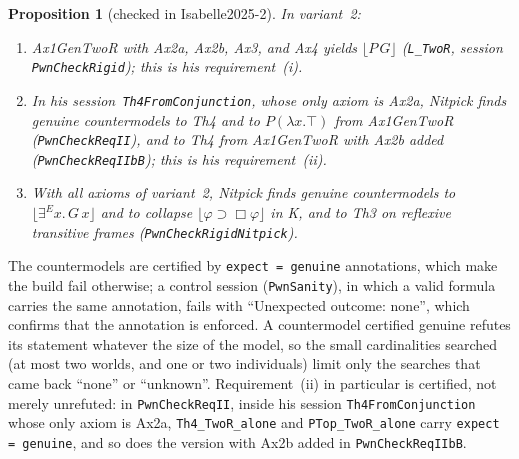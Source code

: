 \documentclass[11pt,a4paper]{article}
\newcommand{\valid}[1]{\lfloor #1 \rfloor}
\newcommand{\Nec}{\Box}
\newcommand{\exE}{\exists^{E}}
\newcommand{\lean}[1]{\texttt{#1}}
\newtheorem{proposition}[theorem]{Proposition}
\theoremstyle{definition}
\theoremstyle{remark}
\begin{document}
\begin{proposition}[checked in Isabelle2025-2]
\label{prop:TwoR}
In variant~2:
\begin{enumerate}[label=(\alph*)]
\item Ax1GenTwoR with Ax2a, Ax2b, Ax3, and Ax4 yields \(\valid{P\,G}\)
  (\lean{L\_TwoR}, session \lean{PwnCheckRigid}); this is his
  requirement~(i).
\item In his session~\lean{Th4FromConjunction}, whose only axiom is Ax2a,
  Nitpick finds genuine countermodels to Th4 and to \(P(\lambda x.\top)\)
  from Ax1GenTwoR (\lean{PwnCheckReqII}), and to Th4 from Ax1GenTwoR with
  Ax2b added (\lean{PwnCheckReqIIbB}); this is his requirement~(ii).
\item With all axioms of variant~2, Nitpick finds genuine countermodels to
  \(\valid{\exE x.\,G\,x}\) and to collapse \(\valid{\varphi \supset
  \Nec\varphi}\) in K, and to Th3 on reflexive transitive frames
  (\lean{PwnCheckRigidNitpick}).
\end{enumerate}
\end{proposition}

The countermodels are certified by \lean{expect = genuine} annotations, which
make the build fail otherwise; a control session (\lean{PwnSanity}), in which
a valid formula carries the same annotation, fails with ``Unexpected outcome:
none'', which confirms that the annotation is enforced.
A countermodel certified genuine refutes its statement whatever the size of
the model, so the small cardinalities searched (at most two worlds, and one
or two individuals) limit only the searches that came back ``none'' or
``unknown''.
Requirement~(ii) in particular is certified, not merely unrefuted: in
\lean{PwnCheckReqII}, inside his session \lean{Th4FromConjunction} whose only
axiom is Ax2a, \lean{Th4\_TwoR\_alone} and \lean{PTop\_TwoR\_alone} carry
\lean{expect = genuine}, and so does the version with Ax2b added in
\lean{PwnCheckReqIIbB}.
\end{document}

